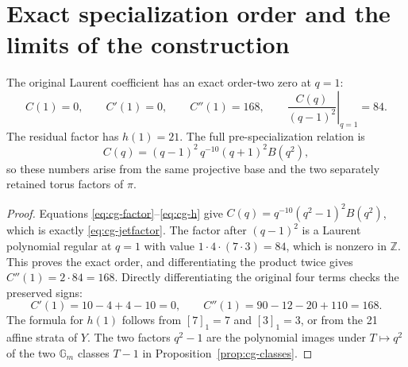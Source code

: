 \section{Exact specialization order and the limits of the construction}
\label{sec:cg-specialization}
\begin{proposition}\label{prop:cg-jets}
The original Laurent coefficient has an exact order-two zero at $q=1$:
\[
 C(1)=0,\qquad C'(1)=0,\qquad C''(1)=168,
 \qquad \left.\frac{C(q)}{(q-1)^2}\right|_{q=1}=84.
\]
The residual factor has $h(1)=21$. The full pre-specialization relation is
\begin{equation}\label{eq:cg-jetfactor}
 C(q)=(q-1)^2\,q^{-10}(q+1)^2B(q^2),
\end{equation}
so these numbers arise from the same projective base and the two
separately retained torus factors of $\pi$.
\end{proposition}
\begin{proof}
Equations \eqref{eq:cg-factor}--\eqref{eq:cg-h} give
$C(q)=q^{-10}(q^2-1)^2B(q^2)$, which is exactly
\eqref{eq:cg-jetfactor}. The factor after $(q-1)^2$ is a Laurent
polynomial regular at $q=1$ with value
$1\cdot4\cdot(7\cdot3)=84$, which is nonzero in $\mathbb Z$.
This proves the exact order, and differentiating the product twice
gives $C''(1)=2\cdot84=168$. Directly differentiating the original
four terms checks the preserved signs:
\[
 C'(1)=10-4+4-10=0,\qquad
 C''(1)=90-12-20+110=168.
\]
The formula for $h(1)$ follows from $[7]_1=7$ and $[3]_1=3$,
or from the 21 affine strata of $Y$. The two factors $q^2-1$
are the polynomial images under $T\mapsto q^2$ of the two
$\mathbb G_m$ classes $T-1$ in Proposition~\ref{prop:cg-classes}.
\end{proof}

